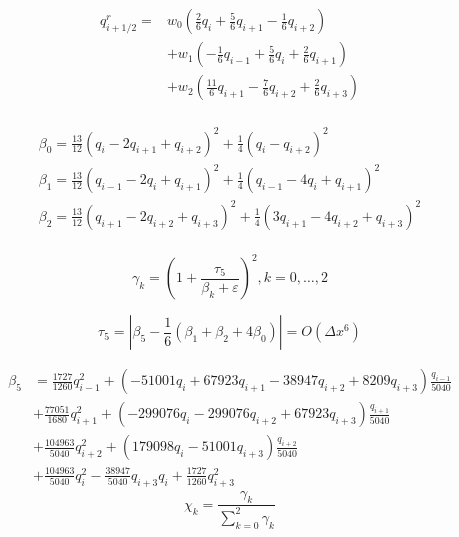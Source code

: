 \begin{equation}
\begin{aligned}
q_{i+1 / 2}^{r}=& w_{0}\left(\frac{2}{6} q_{i}+\frac{5}{6} q_{i+1}-\frac{1}{6} q_{i+2}\right) \\
&+w_{1}\left(-\frac{1}{6} q_{i-1}+\frac{5}{6} q_{i}+\frac{2}{6} q_{i+1}\right) \\
&+w_{2}\left(\frac{11}{6} q_{i+1}-\frac{7}{6} q_{i+2}+\frac{2}{6} q_{i+3}\right) \\
\end{aligned}
\end{equation}

\begin{equation}
\begin{array}{l}
\beta_{0}=\frac{13}{12}\left(q_{i}-2 q_{i+1}+q_{i+2}\right)^{2}+\frac{1}{4}\left(q_{i}-q_{i+2}\right)^{2}\\
\beta_{1}=\frac{13}{12}\left(q_{i-1}-2 q_{i}+q_{i+1}\right)^{2}+\frac{1}{4}\left(q_{i-1}-4 q_{i}+q_{i+1}\right)^{2}\\
\beta_{2}=\frac{13}{12}\left(q_{i+1}-2 q_{i+2}+q_{i+3}\right)^{2}+\frac{1}{4}\left(3q_{i+1}-4 q_{i+2}+q_{i+3}\right)^{2}\\
\end{array}
\end{equation}

\begin{equation}
\gamma_{k}=\left(1+\frac{\tau_{5}}{\beta_{k}+\varepsilon}\right)^{2}, k=0, \ldots, 2
\end{equation}

\begin{equation}
\tau_{5}=\left|\beta_{5}-\frac{1}{6}\left(\beta_{1}+\beta_{2}+4 \beta_{0}\right)\right|=O\left(\Delta x^{6}\right)
\end{equation}

\begin{equation}
\begin{aligned}
\beta_{5}&=\frac{1727}{1260}q_{i-1}^2+(-51001q_{i}+67923q_{i+1} -38947q_{i+2}+8209q_{i+3})\frac{q_{i-1}}{5040}\\
&+\frac{77051}{1680}q_{i+1}^2+(-299076q_{i}-299076q_{i+2}+67923q_{i+3})\frac{q_{i+1}}{5040}\\
&+\frac{104963}{5040}q_{i+2}^2+(179098q_{i}-51001q_{i+3})\frac{q_{i+2}}{5040}\\
&+\frac{104963}{5040}q_{i}^2-\frac{38947}{5040}q_{i+3}q_{i}+\frac{1727}{1260}q_{i+3}^2
\end{aligned}
\end{equation}
\begin{equation}
\chi_{k}=\frac{\gamma_{k}}{\sum_{k=0}^{2} \gamma_{k}}
\end{equation}

